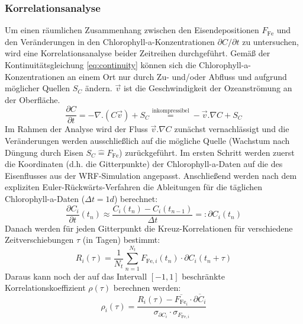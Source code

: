\documentclass[12pt,a4paper,onecolumn]{scrartcl}
\begin{document}
\subsubsection{Korrelationsanalyse}
Um einen räumlichen Zusammenhang zwischen den Eisendepositionen $F_\text{Fe}$ und den Veränderungen in den Chlorophyll-a-Konzentrationen $\partial C / \partial t$ zu untersuchen, wird eine Korrelationsanalyse beider Zeitreihen durchgeführt. Gemäß der Kontinuitätsgleichung \ref{eq:continuity} können sich die Chlorophyll-a-Konzentrationen an einem Ort nur durch Zu- und/oder Abfluss und aufgrund möglicher Quellen $S_C$ ändern. $\vec{v}$ ist die Geschwindigkeit der Ozeanströmung an der Oberfläche.
\begin{equation}
\frac{\partial C}{\partial t} = - \nabla . (C \vec{v}) + S_C  \overset{\text{inkompressibel}}{=} - \vec{v}.\nabla C + S_C \label{eq:continuity}
\end{equation}
Im Rahmen der Analyse wird der Fluss $\vec{v}.\nabla C$ zunächst vernachlässigt und die Veränderungen werden ausschließlich auf die mögliche Quelle (Wachstum nach Düngung durch Eisen $S_C \hat{=} F_\text{Fe}$) zurückgeführt. Im ersten Schritt werden zuerst die Koordinaten (d.h. die Gitterpunkte) der Chlorophyll-a-Daten auf die des Eisenflusses aus der WRF-Simulation angepasst. Anschließend werden nach dem expliziten Euler-Rückwärts-Verfahren die Ableitungen für die täglichen Chlorophyll-a-Daten ($\Delta t = 1d$) berechnet:
\begin{equation}
\frac{\partial C_i}{\partial t} (t_{n}) \approx \frac{C_i(t_{n})-C_i(t_{n-1})}{\Delta t} =: \partial C_i(t_n)
\end{equation}
Danach werden für jeden Gitterpunkt die Kreuz-Korrelationen für verschiedene Zeitverschiebungen $\tau$ (in Tagen) bestimmt:
\begin{equation}
R_i(\tau)= \frac{1}{N_t}\sum\limits_{n=1}^{N_t} F_{\text{Fe},i}(t_n) \cdot \partial C_i(t_n + \tau)
\end{equation}
Daraus kann noch der auf das Intervall $[-1,1]$ beschränkte Korrelationskoeffizient $\rho (\tau)$ berechnen werden:
\begin{equation}
\rho_i(\tau) = \frac{R_i(\tau)-\overline{F_{\text{Fe}_i}} \cdot \overline{\partial C_i}}{\sigma_{\partial C_i} \cdot \sigma_{F_{\text{Fe},i}}}
\end{equation}
\end{document}
